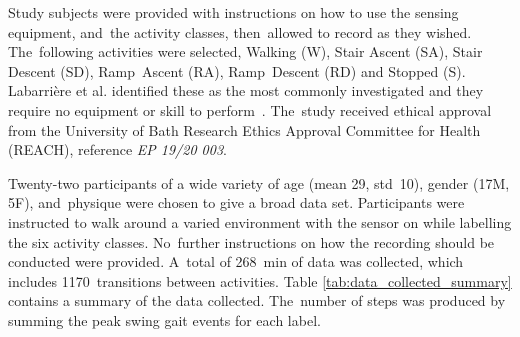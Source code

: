 Study subjects were provided with instructions on how to use the sensing equipment, and~the activity classes, then~allowed to record as they wished. The~following activities were selected, Walking (W), Stair Ascent (SA), Stair Descent (SD), Ramp~Ascent (RA), Ramp~Descent (RD) and Stopped (S). Labarri\`ere et al. identified these as the most commonly investigated and they require no equipment or skill to perform~\cite{Labarriere2020}. The~study received ethical approval from the University of Bath Research Ethics Approval Committee for Health (REACH), reference \textit{EP 19/20 003}.

Twenty-two participants of a wide variety of age (mean 29, std~10), gender (17M, 5F), and~physique were chosen to give a broad data set. Participants were instructed to walk around a varied environment with the sensor on while labelling the six activity classes. No~further instructions on how the recording should be conducted were provided. A~total of 268~min  of data was collected, which includes 1170~transitions between activities. Table \ref{tab:data_collected_summary} contains a summary of the data collected. The~number of steps was produced by summing the peak swing gait events for each label.

